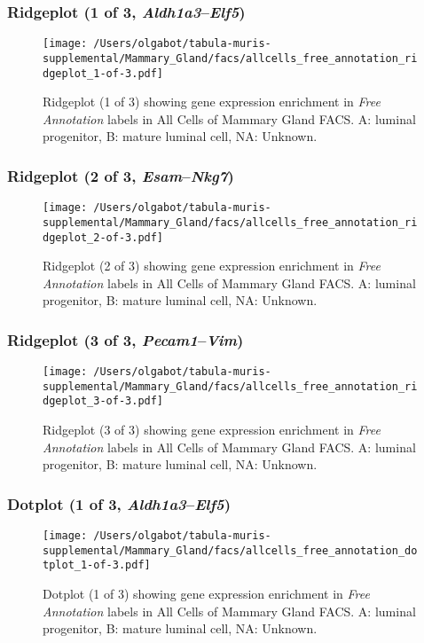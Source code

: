 \clearpage

\subsubsection{Ridgeplot (1 of 3, \emph{Aldh1a3}--\emph{Elf5})}
\begin{figure}[h]
\centering
\texttt{[image: /Users/olgabot/tabula-muris-supplemental/Mammary\_Gland/facs/allcells\_free\_annotation\_ridgeplot\_1-of-3.pdf]}

\caption{ Ridgeplot (1 of 3)  showing gene expression enrichment in \emph{Free Annotation} labels in All Cells of Mammary Gland FACS. A: luminal progenitor, B: mature luminal cell, NA: Unknown.}
\end{figure}


\clearpage

\subsubsection{Ridgeplot (2 of 3, \emph{Esam}--\emph{Nkg7})}
\begin{figure}[h]
\centering
\texttt{[image: /Users/olgabot/tabula-muris-supplemental/Mammary\_Gland/facs/allcells\_free\_annotation\_ridgeplot\_2-of-3.pdf]}

\caption{ Ridgeplot (2 of 3)  showing gene expression enrichment in \emph{Free Annotation} labels in All Cells of Mammary Gland FACS. A: luminal progenitor, B: mature luminal cell, NA: Unknown.}
\end{figure}


\clearpage

\subsubsection{Ridgeplot (3 of 3, \emph{Pecam1}--\emph{Vim})}
\begin{figure}[h]
\centering
\texttt{[image: /Users/olgabot/tabula-muris-supplemental/Mammary\_Gland/facs/allcells\_free\_annotation\_ridgeplot\_3-of-3.pdf]}

\caption{ Ridgeplot (3 of 3)  showing gene expression enrichment in \emph{Free Annotation} labels in All Cells of Mammary Gland FACS. A: luminal progenitor, B: mature luminal cell, NA: Unknown.}
\end{figure}


\clearpage

\subsubsection{Dotplot (1 of 3, \emph{Aldh1a3}--\emph{Elf5})}
\begin{figure}[h]
\centering
\texttt{[image: /Users/olgabot/tabula-muris-supplemental/Mammary\_Gland/facs/allcells\_free\_annotation\_dotplot\_1-of-3.pdf]}

\caption{ Dotplot (1 of 3)  showing gene expression enrichment in \emph{Free Annotation} labels in All Cells of Mammary Gland FACS. A: luminal progenitor, B: mature luminal cell, NA: Unknown.}
\end{figure}


